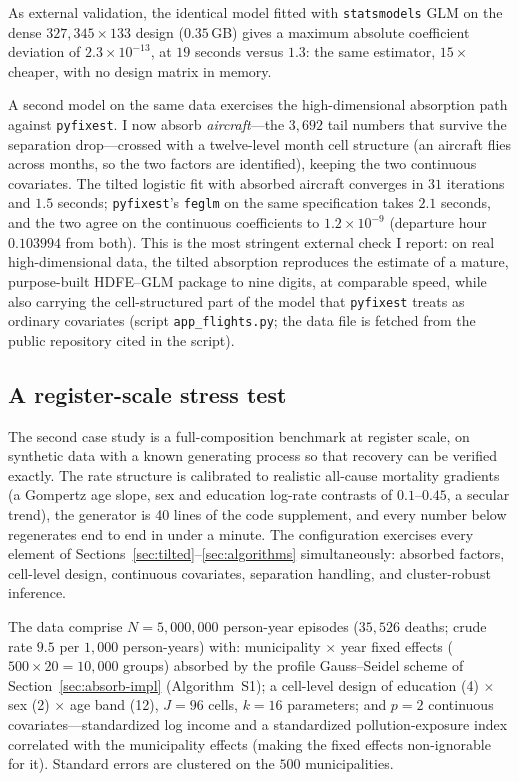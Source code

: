 \documentclass[11pt]{article}
\begin{document}
As external validation, the identical model fitted with
\texttt{statsmodels} GLM on the dense $327{,}345 \times 133$ design
($0.35$\,GB) gives a maximum absolute coefficient deviation of
$2.3 \times 10^{-13}$, at $19$ seconds versus $1.3$: the same estimator,
$15\times$ cheaper, with no design matrix in memory.

A second model on the same data exercises the high-dimensional
absorption path against \texttt{pyfixest}.  I now absorb
\emph{aircraft}---the $3{,}692$ tail numbers that survive the separation
drop---crossed with a twelve-level month cell structure (an aircraft
flies across months, so the two factors are identified), keeping the two
continuous covariates.  The tilted logistic fit with absorbed aircraft
converges in $31$ iterations and $1.5$ seconds; \texttt{pyfixest}'s
\texttt{feglm} on the same specification takes $2.1$ seconds, and the two
agree on the continuous coefficients to $1.2 \times 10^{-9}$ (departure
hour $0.103994$ from both).  This is the most stringent external check
I report: on real high-dimensional data, the tilted absorption reproduces
the estimate of a mature, purpose-built HDFE--GLM package to nine digits,
at comparable speed, while also carrying the cell-structured part of the
model that \texttt{pyfixest} treats as ordinary covariates
(script \texttt{app\_flights.py}; the data file is fetched from the
public repository cited in the script).

\subsection{A register-scale stress test}\label{sec:app-register}

The second case study is a full-composition benchmark at register
scale, on synthetic data with a known generating process so that
recovery can be verified exactly.  The rate structure is calibrated to
realistic all-cause mortality gradients (a Gompertz age slope,
sex and education log-rate contrasts of $0.1$--$0.45$, a secular trend),
the generator is 40 lines of the code supplement, and every number below
regenerates end to end in under a minute.  The configuration exercises
every element of Sections~\ref{sec:tilted}--\ref{sec:algorithms}
simultaneously: absorbed factors, cell-level design, continuous
covariates, separation handling, and cluster-robust inference.

The data comprise $N = 5{,}000{,}000$ person-year episodes ($35{,}526$
deaths; crude rate $9.5$ per $1{,}000$ person-years) with:
municipality $\times$ year fixed effects ($500 \times 20 = 10{,}000$
groups) absorbed by the profile Gauss--Seidel scheme of Section~\ref{sec:absorb-impl} (Algorithm~S1); a cell-level design of
education (4) $\times$ sex (2) $\times$ age band (12), $J = 96$ cells,
$k = 16$ parameters; and $p = 2$ continuous covariates---standardized log
income and a standardized pollution-exposure index correlated with the
municipality effects (making the fixed effects non-ignorable for it).
Standard errors are clustered on the $500$ municipalities.
\end{document}
